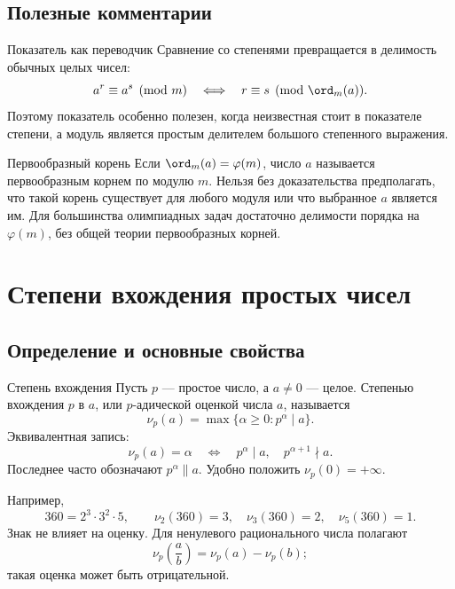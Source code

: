 \section{Полезные комментарии}

\begin{commentbox}{Показатель как переводчик}
Сравнение со степенями превращается в делимость обычных целых чисел:
\[
  a^r\equiv a^s\pmod m
  \quad\Longleftrightarrow\quad
  r\equiv s\pmod{\ord_m(a)}.
\]
Поэтому показатель особенно полезен, когда неизвестная стоит в
показателе степени, а модуль является простым делителем большого
степенного выражения.
\end{commentbox}

\begin{commentbox}{Первообразный корень}
Если $\ord_m(a)=\varphi(m)$, число $a$ называется первообразным корнем
по модулю $m$. Нельзя без доказательства предполагать, что такой корень
существует для любого модуля или что выбранное $a$ является им. Для
большинства олимпиадных задач достаточно делимости порядка на
$\varphi(m)$, без общей теории первообразных корней.
\end{commentbox}

\chapter{Степени вхождения простых чисел}

\section{Определение и основные свойства}

\begin{definitionbox}{Степень вхождения}
Пусть $p$ --- простое число, а $a\ne0$ --- целое. Степенью вхождения
$p$ в $a$, или $p$-адической оценкой числа $a$, называется
\[
  \nu_p(a)=\max\{\alpha\ge0:p^\alpha\mid a\}.
\]
Эквивалентная запись:
\[
  \nu_p(a)=\alpha
  \quad\Longleftrightarrow\quad
  p^\alpha\mid a,
  \quad p^{\alpha+1}\nmid a.
\]
Последнее часто обозначают $p^\alpha\parallel a$. Удобно положить
$\nu_p(0)=+\infty$.
\end{definitionbox}

Например,
\[
  360=2^3\cdot3^2\cdot5,
  \qquad
  \nu_2(360)=3,
  \quad\nu_3(360)=2,
  \quad\nu_5(360)=1.
\]
Знак не влияет на оценку. Для ненулевого рационального числа полагают
\[
  \nu_p\!\left(\frac ab\right)=\nu_p(a)-\nu_p(b);
\]
такая оценка может быть отрицательной.

